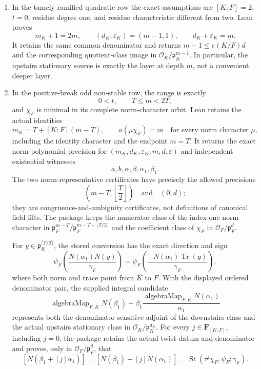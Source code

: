 \begin{theorem}
\begin{enumerate}
\item In the tamely ramified quadratic row the exact assumptions are
$[K:F]=2$, $t=0$, residue degree one, and residue characteristic different
from two.  Lean proves
\[
 m_K+1=2m,
 \qquad (d_K,\varepsilon_K)=(m-1,1),
 \qquad d_K+\varepsilon_K=m.
\]
It retains the same common denominator and returns
$m-1\leq e(K/F)d$ and the corresponding quotient-class image in
$\mathcal O_K/\mathfrak p_K^{m-1}$.  In particular, the upstairs stationary
source is exactly the layer at depth $m$, not a convenient deeper layer.

\item In the positive-break odd non-stable row, the range is exactly
\[
 0<t,
 \qquad T\leq m<2T,
\]
and $\chi_F$ is minimal in its complete norm-character orbit.  Lean retains
the actual identities
\[
 m_K=T+[K:F](m-T),
 \qquad
 a(\mu\chi_F)=m\quad\text{for every norm character }\mu,
\]
including the identity character and the endpoint $m=T$.  It returns the
exact norm-polynomial precision for
$(m_K,d_K,\varepsilon_K;m,d,\varepsilon)$ and independent existential
witnesses
\[
 a,b,\alpha,\beta,\alpha_1,\beta_1.
\]
The two norm-representative certificates have precisely the allowed
precisions
\[
 \left(m-T,\left\lfloor\frac T2\right\rfloor\right)
 \quad\text{and}\quad (0,d);
\]
they are congruence-and-ambiguity certificates, not definitions of canonical
field lifts.  The package keeps the numerator class of the index-one norm
character in
$\mathfrak p_F^{m-T}/\mathfrak p_F^{m-T+\lfloor T/2\rfloor}$ and the
coefficient class of $\chi_F$ in
$\mathcal O_F/\mathfrak p_F^d$.

For $y\in\mathfrak p_K^{\lceil T/2\rceil}$, the stored conversion has the
exact direction and sign
\[
 \psi_F\!\left(\frac{N(\alpha_1)N(y)}{\gamma_F}\right)
 =
 \psi_F\!\left(\frac{-N(\alpha_1)\operatorname{Tr}(y)}{\gamma_F}\right),
\]
where both norm and trace point from $K$ to $F$.  With the displayed ordered
denominator pair, the supplied integral candidate
\[
 \operatorname{algebraMap}_{F,K}N(\beta_1)
 -\beta_1\frac{\operatorname{algebraMap}_{F,K}N(\alpha_1)}{\alpha_1}
\]
represents both the denominator-sensitive adjoint of the downstairs class
and the actual upstairs stationary class in
$\mathcal O_K/\mathfrak p_K^{d_K}$.  For every
$j\in\mathbf F_{[K:F]}$, including $j=0$, the package retains the actual
twist datum and denominator and proves, only in
$\mathcal O_F/\mathfrak p_F^d$, that
\[
 [N(\beta_1+[j]\alpha_1)]
 =[N(\beta_1)+[j]N(\alpha_1)]
 =\operatorname{St}(\tau^j\chi_F,\psi_F;\gamma_F).
\]


\end{enumerate}
\end{theorem}
